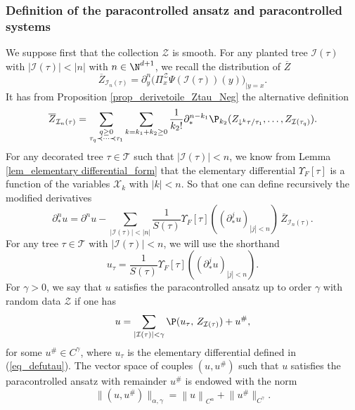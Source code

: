 \documentclass[11pt]{preprint}
\newcommand{\mcI}{\mathcal{I}}
\newcommand{\mcX}{\mathcal{X}}
\newcommand{\mcZ}{\mathcal{Z}}
\newcommand{\mcT}{\mathcal{T}}
\def\eqref#1{(\ref{#1})}
\newcommand{\norme}[1]{\left\lVert #1 \right\lVert}
\begin{document}
	\subsubsection{Definition of the paracontrolled ansatz and paracontrolled systems}
	We suppose first that the collection $\mcZ$ is smooth. For any planted tree $\mcI(\tau)$ with $|\mcI(\tau)|<|n|$ with $n \in \N^{d+1}$, we recall the distribution of $\overline Z$
	\begin{equation} \label{eq_defZplusNeg}
		\overline Z_{\mcI_{n}(\tau)} = \partial^{n}_y\Big( { \Pi}^\mcZ_x \Psi(\mcI (\tau))(y)\Big)_{|y=x}.
			\end{equation}
	It has from Proposition \ref{prop_derivetoile_Ztau_Neg} the alternative definition
	$$
	\overline Z_{\mcI_{n}(\tau)} = \sum_{\substack{q\geq 0 \\ \tau_q\prec\dots\prec\tau_1}}\sum_{k=k_1+k_2\geq0} \frac{1}{k_2!} \partial^{n-k_1}_*  \P_{k_2}(Z_{\downarrow^k\tau/\tau_1},\dots,Z_{\mcI(\tau_q)}  ).
	$$
	For any decorated tree $\tau\in\mcT$ such that $|\mcI(\tau)|<n$, we know from Lemma \ref{lem_elementary differential_form} that the elementary differential $\Upsilon_F[\tau]$ is a function of the variables $\mcX_k$ with $|k|<n$. So that one can define recursively the modified derivatives
	\begin{equation}\label{eqdef_partialStarU}
		\partial_*^{n} u = \partial^{n} u - \sum_{|\mcI(\tau)|<|n|} \frac{1}{S(\tau)}\Upsilon_F[\tau]( (\partial^j_*u)_{|j|<n} ) \, \overline Z_{\mcI_{n}(\tau)}.
\end{equation}
	For any tree $\tau\in\mcT$ with $|\mcI(\tau)|<n$, we will use the shorthand 
	\begin{equation}\label{eq_defutau}
		u_\tau = \frac{1}{S(\tau)}\Upsilon_F[\tau]( (\partial^j_*u)_{|j|<n} ).
	\end{equation}
	For $\gamma > 0$, we say that $u$ satisfies the paracontrolled ansatz up to order $\gamma$ with random data $\mcZ$ if one has   
		\begin{equation}\label{eq_pamansatz}
		u=\sum_{|\mcI(\tau)|<\gamma} \P(u_\tau , \, Z_{\mcI(\tau)} ) + u^\#,
	\end{equation}
		for some $u^\#\in C^\gamma$, where $u_\tau$ is the elementary differential defined in \eqref{eq_defutau}.
		The vector space of couples $(u,u^\#)$ such that $u$ satisfies the paracontrolled ansatz with remainder $u^\#$ is endowed with the norm
		$$
		\lVert(u,u^\#)\lVert_{\alpha,\gamma}  = \norme{u}_{C^\alpha} + \lVert u^\# \lVert_{C^\gamma}.
		$$ 
	
\end{document}
